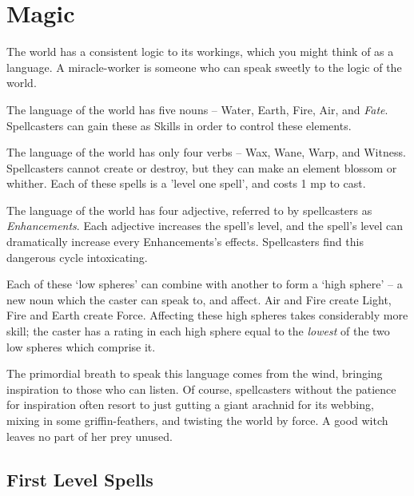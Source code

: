 \chapter[Chamber of Magic]{Magic}

\begin{multicols}{2}

\noindent
The world has a consistent logic to its workings, which you might think of as a language.
A miracle-worker is someone who can speak sweetly to the logic of the world.

The language of the world has five nouns -- Water, Earth, Fire, Air, and \textit{Fate}.
Spellcasters can gain these as Skills in order to control these elements.

The language of the world has only four verbs -- Wax, Wane, Warp, and Witness.
Spellcasters cannot create or destroy, but they can make an element blossom or whither.
Each of these spells is a 'level one spell', and costs 1 \gls{mp} to cast.

The language of the world has four adjective, referred to by spellcasters as \textit{Enhancements}.
Each adjective increases the spell's level, and the spell's level can dramatically increase every Enhancements's effects.
Spellcasters find this dangerous cycle intoxicating.

Each of these `low spheres' can combine with another to form a `high sphere' -- a new noun which the caster can speak to, and affect.
Air and Fire create Light, Fire and Earth create Force.
Affecting these high spheres takes considerably more skill; the caster has a rating in each high sphere equal to the \emph{lowest} of the two low spheres which comprise it.

The primordial breath to speak this language comes from the wind, bringing inspiration to those who can listen.
Of course, spellcasters without the patience for inspiration often resort to just gutting a giant arachnid for its webbing, mixing in some griffin-feathers, and twisting the world by force.
A good witch leaves no part of her prey unused. 



\end{multicols}

\vspace{3em}

\section{First Level Spells}


